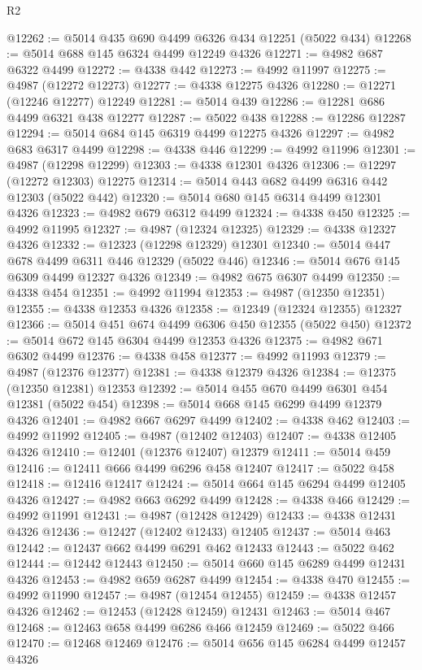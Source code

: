 \begin{lexlean}{R2}
\begin{coremodule}
@12262 := @5014 @435 @690 @4499 @6326 @434 @12251 (@5022 @434)
@12268 := @5014 @688 @145 @6324 @4499 @12249 @4326
@12271 := @4982 @687 @6322 @4499
@12272 := @4338 @442
@12273 := @4992 @11997
@12275 := @4987 (@12272 @12273)
@12277 := @4338 @12275 @4326
@12280 := @12271 (@12246 @12277) @12249
@12281 := @5014 @439
@12286 := @12281 @686 @4499 @6321 @438 @12277
@12287 := @5022 @438
@12288 := @12286 @12287
@12294 := @5014 @684 @145 @6319 @4499 @12275 @4326
@12297 := @4982 @683 @6317 @4499
@12298 := @4338 @446
@12299 := @4992 @11996
@12301 := @4987 (@12298 @12299)
@12303 := @4338 @12301 @4326
@12306 := @12297 (@12272 @12303) @12275
@12314 := @5014 @443 @682 @4499 @6316 @442 @12303 (@5022 @442)
@12320 := @5014 @680 @145 @6314 @4499 @12301 @4326
@12323 := @4982 @679 @6312 @4499
@12324 := @4338 @450
@12325 := @4992 @11995
@12327 := @4987 (@12324 @12325)
@12329 := @4338 @12327 @4326
@12332 := @12323 (@12298 @12329) @12301
@12340 := @5014 @447 @678 @4499 @6311 @446 @12329 (@5022 @446)
@12346 := @5014 @676 @145 @6309 @4499 @12327 @4326
@12349 := @4982 @675 @6307 @4499
@12350 := @4338 @454
@12351 := @4992 @11994
@12353 := @4987 (@12350 @12351)
@12355 := @4338 @12353 @4326
@12358 := @12349 (@12324 @12355) @12327
@12366 := @5014 @451 @674 @4499 @6306 @450 @12355 (@5022 @450)
@12372 := @5014 @672 @145 @6304 @4499 @12353 @4326
@12375 := @4982 @671 @6302 @4499
@12376 := @4338 @458
@12377 := @4992 @11993
@12379 := @4987 (@12376 @12377)
@12381 := @4338 @12379 @4326
@12384 := @12375 (@12350 @12381) @12353
@12392 := @5014 @455 @670 @4499 @6301 @454 @12381 (@5022 @454)
@12398 := @5014 @668 @145 @6299 @4499 @12379 @4326
@12401 := @4982 @667 @6297 @4499
@12402 := @4338 @462
@12403 := @4992 @11992
@12405 := @4987 (@12402 @12403)
@12407 := @4338 @12405 @4326
@12410 := @12401 (@12376 @12407) @12379
@12411 := @5014 @459
@12416 := @12411 @666 @4499 @6296 @458 @12407
@12417 := @5022 @458
@12418 := @12416 @12417
@12424 := @5014 @664 @145 @6294 @4499 @12405 @4326
@12427 := @4982 @663 @6292 @4499
@12428 := @4338 @466
@12429 := @4992 @11991
@12431 := @4987 (@12428 @12429)
@12433 := @4338 @12431 @4326
@12436 := @12427 (@12402 @12433) @12405
@12437 := @5014 @463
@12442 := @12437 @662 @4499 @6291 @462 @12433
@12443 := @5022 @462
@12444 := @12442 @12443
@12450 := @5014 @660 @145 @6289 @4499 @12431 @4326
@12453 := @4982 @659 @6287 @4499
@12454 := @4338 @470
@12455 := @4992 @11990
@12457 := @4987 (@12454 @12455)
@12459 := @4338 @12457 @4326
@12462 := @12453 (@12428 @12459) @12431
@12463 := @5014 @467
@12468 := @12463 @658 @4499 @6286 @466 @12459
@12469 := @5022 @466
@12470 := @12468 @12469
@12476 := @5014 @656 @145 @6284 @4499 @12457 @4326

\end{coremodule}
\end{lexlean}
